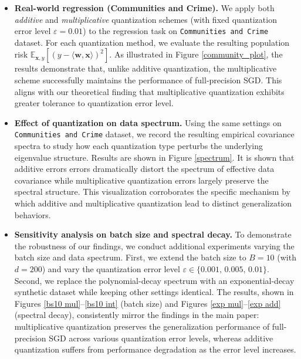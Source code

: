 \documentclass[11pt, letterpaper]{article}
\begin{document}
\begin{itemize}[leftmargin=*]
    \item \textbf{Real-world regression (Communities and Crime).}  
    We apply both \emph{additive} and \emph{multiplicative} quantization schemes (with fixed quantization error level $\varepsilon=0.01$) to the regression task on \texttt{Communities and Crime} dataset. For each quantization method, we evaluate the resulting population risk $\mathbb{E}_{\mathbf{x},y}\left[\left(y-\langle \mathbf{w},\mathbf{x} \rangle \right)^2\right]$. As illustrated in Figure \ref{community_plot}, the results demonstrate that, unlike additive quantization, the multiplicative scheme successfully maintains the performance of full-precision SGD. This aligns with our theoretical finding that multiplicative quantization exhibits greater tolerance to quantization error level.

    \item \textbf{Effect of quantization on data spectrum.}  
    Using the same settings on \texttt{Communities and Crime} dataset, we record the resulting empirical covariance spectra to study how each quantization type perturbs the underlying eigenvalue structure. Results are shown in Figure \ref{spectrum}. It is shown that additive errors errors dramatically distort the spectrum of effective data covariance while multiplicative quantization errors largely preserve the spectral structure. This visualization corroborates the specific mechanism by which additive and multiplicative quantization lead to distinct generalization behaviors.

    \item \textbf{Sensitivity analysis on batch size and spectral decay.} To demonstrate the robustness of our findings, we conduct additional experiments varying the batch size and data spectrum. First, we extend the batch size to $B=10$ (with $d=200$) and vary the quantization error level $\varepsilon\in\{0.001,\,0.005,\,0.01\}$. Second, we replace the polynomial-decay spectrum with an exponential-decay synthetic dataset while keeping other settings identical. The results, shown in Figures \ref{bs10 mul}--\ref{bs10 int} (batch size) and Figures \ref{exp mul}--\ref{exp add} (spectral decay), consistently mirror the findings in the main paper: multiplicative quantization preserves the generalization performance of full-precision SGD across various quantization error levels, whereas additive quantization suffers from performance degradation as the error level increases.
\end{itemize}
\end{document}
